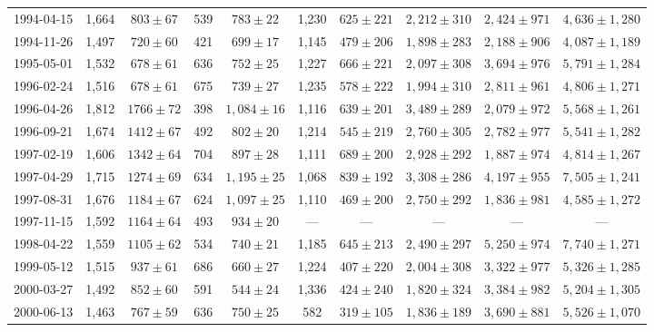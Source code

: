 \begin{landscape}
\begin{longtable}{cccccccccc}
{1994-04-15} & 1,664 & {$803  \pm  67$} & 539 & {$783 \pm 22$} & 1,230 & {$625 \pm 221$} & {$2,212 \pm 310$} & {$2,424 \pm 971$} & {$4,636 \pm 1,280$} \\
{1994-11-26} & 1,497 & {$720  \pm  60$} & 421 & {$699 \pm 17$} & 1,145 & {$479 \pm 206$} & {$1,898 \pm 283$} & {$2,188 \pm 906$} & {$4,087 \pm 1,189$} \\
{1995-05-01} & 1,532 & {$678  \pm  61$} & 636 & {$752 \pm 25$} & 1,227 & {$666 \pm 221$} & {$2,097 \pm 308$} & {$3,694 \pm 976$} & {$5,791 \pm 1,284$} \\
{1996-02-24} & 1,516 & {$678  \pm  61$} & 675 & {$739 \pm 27$} & 1,235 & {$578 \pm 222$} & {$1,994 \pm 310$} & {$2,811 \pm 961$} & {$4,806 \pm 1,271$} \\
{1996-04-26} & 1,812 & {$1766  \pm  72$} & 398 & {$1,084 \pm 16$} & 1,116 & {$639 \pm 201$} & {$3,489 \pm 289$} & {$2,079 \pm 972$} & {$5,568 \pm 1,261$} \\
{1996-09-21} & 1,674 & {$1412  \pm  67$} & 492 & {$802 \pm 20$} & 1,214 & {$545 \pm 219$} & {$2,760 \pm 305$} & {$2,782 \pm 977$} & {$5,541 \pm 1,282$} \\
{1997-02-19} & 1,606 & {$1342  \pm  64$} & 704 & {$897 \pm 28$} & 1,111 & {$689 \pm 200$} & {$2,928 \pm 292$} & {$1,887 \pm 974$} & {$4,814 \pm 1,267$} \\
{1997-04-29} & 1,715 & {$1274  \pm  69$} & 634 & {$1,195 \pm 25$} & 1,068 & {$839 \pm 192$} & {$3,308 \pm 286$} & {$4,197 \pm 955$} & {$7,505 \pm 1,241$} \\
{1997-08-31} & 1,676 & {$1184  \pm  67$} & 624 & {$1,097 \pm 25$} & 1,110 & {$469 \pm 200$} & {$2,750 \pm 292$} & {$1,836 \pm 981$} & {$4,585 \pm 1,272$} \\
{1997-11-15} & 1,592 & {$1164  \pm  64$} & 493 & {$934 \pm 20$} & --- & --- & --- & --- & --- \\
{1998-04-22} & 1,559 & {$1105  \pm  62$} & 534 & {$740 \pm 21$} & 1,185 & {$645 \pm 213$} & {$2,490 \pm 297$} & {$5,250 \pm 974$} & {$7,740 \pm 1,271$} \\
{1999-05-12} & 1,515 & {$937  \pm  61$} & 686 & {$660 \pm 27$} & 1,224 & {$407 \pm 220$} & {$2,004 \pm 308$} & {$3,322 \pm 977$} & {$5,326 \pm 1,285$} \\
{2000-03-27} & 1,492 & {$852  \pm  60$} & 591 & {$544 \pm 24$} & 1,336 & {$424 \pm 240$} & {$1,820 \pm 324$} & {$3,384 \pm 982$} & {$5,204 \pm 1,305$} \\
{2000-06-13} & 1,463 & {$767  \pm  59$} & 636 & {$750 \pm 25$} & 582 & {$319 \pm 105$} & {$1,836 \pm 189$} & {$3,690 \pm 881$} & {$5,526 \pm 1,070$} \\

\end{longtable}
\end{landscape}
